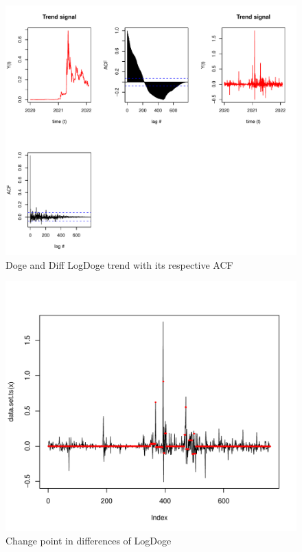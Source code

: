 \documentclass[
]{article}
\begin{document}
\begin{figure}
\centering
\includegraphics{Trial1_files/figure-latex/fig19-1.pdf}
\caption{\label{fig:fig19}Doge and Diff LogDoge trend with its
respective ACF}
\end{figure}

\begin{figure}
\centering
\includegraphics{Trial1_files/figure-latex/fig20-1.pdf}
\caption{\label{fig:fig20}Change point in differences of LogDoge}
\end{figure}
\end{document}
